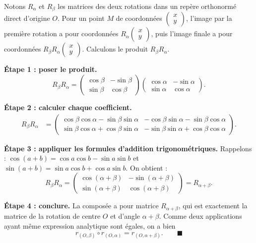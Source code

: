 \documentclass[11pt]{article}
\begin{document}
\begin{experience}
Notons $R_\alpha$ et $R_\beta$ les matrices des deux rotations dans un repère orthonormé direct d'origine $O$. Pour un point $M$ de coordonnées $\begin{pmatrix} x \\ y \end{pmatrix}$, l'image par la première rotation a pour coordonnées $R_\alpha \begin{pmatrix} x \\ y \end{pmatrix}$, puis l'image finale a pour coordonnées $R_\beta R_\alpha \begin{pmatrix} x \\ y \end{pmatrix}$. Calculons le produit $R_\beta R_\alpha$.

\textbf{Étape 1 : poser le produit.}
\[
R_\beta R_\alpha =
\begin{pmatrix} \cos\beta & -\sin\beta \\ \sin\beta & \cos\beta \end{pmatrix}
\begin{pmatrix} \cos\alpha & -\sin\alpha \\ \sin\alpha & \cos\alpha \end{pmatrix}.
\]

\textbf{Étape 2 : calculer chaque coefficient.}
\begin{align*}
R_\beta R_\alpha &=
\begin{pmatrix}
\cos\beta\cos\alpha - \sin\beta\sin\alpha & -\cos\beta\sin\alpha - \sin\beta\cos\alpha \\
\sin\beta\cos\alpha + \cos\beta\sin\alpha & -\sin\beta\sin\alpha + \cos\beta\cos\alpha
\end{pmatrix}.
\end{align*}

\textbf{Étape 3 : appliquer les formules d'addition trigonométriques.}
Rappelons : $\cos(a+b) = \cos a\cos b - \sin a\sin b$ et $\sin(a+b) = \sin a\cos b + \cos a\sin b$. On obtient :
\[
R_\beta R_\alpha =
\begin{pmatrix}
\cos(\alpha+\beta) & -\sin(\alpha+\beta) \\
\sin(\alpha+\beta) & \cos(\alpha+\beta)
\end{pmatrix}
= R_{\alpha+\beta}.
\]

\textbf{Étape 4 : conclure.} La composée a pour matrice $R_{\alpha+\beta}$, qui est exactement la matrice de la rotation de centre $O$ et d'angle $\alpha+\beta$. Comme deux applications ayant même expression analytique sont égales, on a bien
\[ r_{(O,\beta)} \circ r_{(O,\alpha)} = r_{(O,\alpha+\beta)}. \qquad \blacksquare \]
\end{experience}
\end{document}
